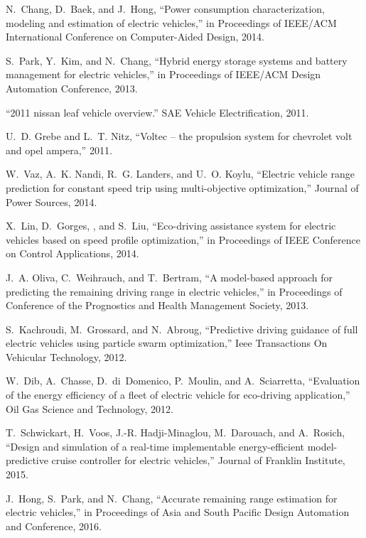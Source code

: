 

N.~Chang, D.~Baek, and J.~Hong, ``Power consumption characterization, modeling
  and estimation of electric vehicles,'' in Proceedings of IEEE/ACM
  International Conference on Computer-Aided Design, 2014.

S.~Park, Y.~Kim, and N.~Chang, ``Hybrid energy storage systems and battery
  management for electric vehicles,'' in Proceedings of IEEE/ACM Design
  Automation Conference, 2013.

``2011 nissan leaf vehicle overview.'' SAE Vehicle Electrification, 2011.

U.~D. Grebe and L.~T. Nitz, ``Voltec – the propulsion system for chevrolet
  volt and opel ampera,'' 2011.

W.~Vaz, A.~K. Nandi, R.~G. Landers, and U.~O. Koylu, ``Electric vehicle range
  prediction for constant speed trip using multi-objective optimization,'' 
  Journal of Power Sources, 2014.

X.~Lin, D.~Gorges, , and S.~Liu, ``Eco-driving assistance system for electric
  vehicles based on speed profile optimization,'' in Proceedings of IEEE
  Conference on Control Applications, 2014.

J.~A. Oliva, C.~Weihrauch, and T.~Bertram, ``A model-based approach for
  predicting the remaining driving range in electric vehicles,'' in 
  Proceedings of Conference of the Prognostics and Health Management Society,
  2013.

S.~Kachroudi, M.~Grossard, and N.~Abroug, ``Predictive driving guidance of full
  electric vehicles using particle swarm optimization,'' Ieee Transactions
  On Vehicular Technology, 2012.

W.~Dib, A.~Chasse, D.~di~Domenico, P.~Moulin, and A.~Sciarretta, ``Evaluation
  of the energy efficiency of a fleet of electric vehicle for eco-driving
  application,'' Oil Gas Science and Technology, 2012.

T.~Schwickart, H.~Voos, J.-R. Hadji-Minaglou, M.~Darouach, and A.~Rosich,
  ``Design and simulation of a real-time implementable energy-efficient
  model-predictive cruise controller for electric vehicles,'' Journal of
  Franklin Institute, 2015.

J.~Hong, S.~Park, and N.~Chang, ``Accurate remaining range estimation for
  electric vehicles,'' in Proceedings of Asia and South Pacific Design
  Automation and Conference, 2016.


